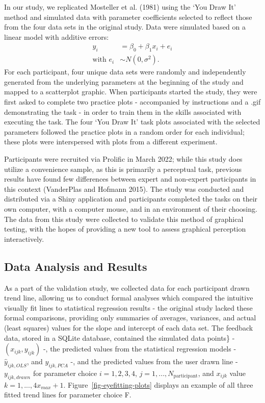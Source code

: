 \documentclass[
]{jds}
\begin{document}
In our study, we replicated Mosteller et al. (1981) using the `You Draw
It' method and simulated data with parameter coefficients selected to
reflect those from the four data sets in the original study. Data were
simulated based on a linear model with additive errors: \begin{align}
y_i & = \beta_0 + \beta_1 x_i + e_i \\
\text{with } e_i & \sim N(0, \sigma^2). \nonumber
\end{align} For each participant, four unique data sets were randomly
and independently generated from the underlying parameters at the
beginning of the study and mapped to a scatterplot graphic. When
participants started the study, they were first asked to complete two
practice plots - accompanied by instructions and a .gif demonstrating
the task - in order to train them in the skills associated with
executing the task. The four `You Draw It' task plots associated with
the selected parameters followed the practice plots in a random order
for each individual; these plots were interspersed with plots from a
different experiment.

Participants were recruited via Prolific in March 2022; while this study
does utilize a convenience sample, as this is primarily a perceptual
task, previous results have found few differences between expert and
non-expert participants in this context (VanderPlas and Hofmann 2015).
The study was conducted and distributed via a Shiny application and
participants completed the tasks on their own computer, with a computer
mouse, and in an environment of their choosing. The data from this study
were collected to validate this method of graphical testing, with the
hopes of providing a new tool to assess graphical perception
interactively.

\hypertarget{data-analysis-and-results}{%
\subsection{Data Analysis and Results}\label{data-analysis-and-results}}

As a part of the validation study, we collected data for each
participant drawn trend line, allowing us to conduct formal analyses
which compared the intuitive visually fit lines to statistical
regression results - the original study lacked these formal comparisons,
providing only summaries of averages, variances, and actual (least
squares) values for the slope and intercept of each data set. The
feedback data, stored in a SQLite database, contained the simulated data
points\} - \((x_{ijk}, y_{ijk})\) -, the predicted values from the
statistical regression models - \(\hat y_{ijk,OLS}\), and
\(\hat y_{ijk,PCA}\) -, and the predicted values from the user drawn
line - \(y_{ijk,drawn}\) for parameter choice \(i = 1,2,3,4\),
\(j = 1,...,N_\text{participant}\), and \(x_{ijk}\) value
\(k = 1, ...,4 x_{max} + 1\). Figure~\ref{fig-eyefitting-plots} displays
an example of all three fitted trend lines for parameter choice F.
\end{document}
